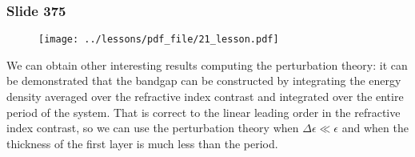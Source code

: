 \documentclass[../main/main.tex]{subfiles}
\begin{document}
\newpage

\subsubsection{Slide 375}

\begin{figure}[h!]
\centering
\texttt{[image: ../lessons/pdf\_file/21\_lesson.pdf]}
\end{figure}

We can obtain other interesting results computing the perturbation theory: it can be demonstrated that the bandgap can be constructed by integrating the energy density averaged over the refractive index contrast and integrated over the entire period of the system.
That is correct to the linear leading order in the refractive index contrast, so we can use the perturbation theory when $\Delta \epsilon \ll \epsilon $ and when the thickness of the first layer is much less than the period.



\clearpage
\end{document}
